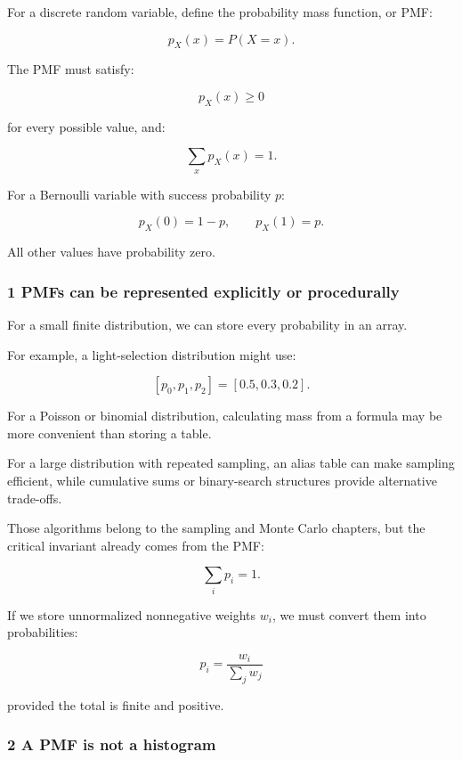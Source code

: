 \hypertarget{02-foundations-ii-ch023-probability-mass-functions}{}

For a discrete random variable, define the probability mass function, or PMF:

\[
 \boxed{ p_X(x)=P(X=x) }.
\]

The PMF must satisfy:

\[
 p_X(x)\ge0
\]

for every possible value, and:

\[
 \boxed{ \sum_xp_X(x)=1 }.
\]

For a Bernoulli variable with success probability \(p\):

\[
 p_X(0)=1-p, \qquad p_X(1)=p.
\]

All other values have probability zero.

\subsubsection{1 PMFs can be represented explicitly or procedurally}\label{02-foundations-ii-ch023-pmfs-can-be-represented-explicitly-or-procedurally}

\hypertarget{02-foundations-ii-ch023-pmfs-can-be-represented-explicitly-or-procedurally}{}

For a small finite distribution, we can store every probability in an array.

For example, a light-selection distribution might use:

\[
 [p_0,p_1,p_2]=[0.5,0.3,0.2].
\]

For a Poisson or binomial distribution, calculating mass from a formula may be more convenient than storing a table.

For a large distribution with repeated sampling, an alias table can make sampling efficient, while cumulative sums or binary-search structures provide alternative trade-offs.

Those algorithms belong to the sampling and Monte Carlo chapters, but the critical invariant already comes from the PMF:

\[
 \sum_ip_i=1.
\]

If we store unnormalized nonnegative weights \(w_i\), we must convert them into probabilities:

\[
 \boxed{ p_i=\frac{w_i}{\sum_jw_j} }
\]

provided the total is finite and positive.

\subsubsection{2 A PMF is not a histogram}\label{02-foundations-ii-ch023-a-pmf-is-not-a-histogram}

